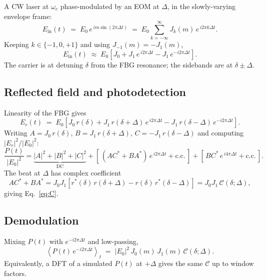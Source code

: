 \documentclass[aps,pra, onecolumn,superscriptaddress,nopacs,floatfix, showkeys, notitlepage]{revtex4-1}
\begin{document}
A CW laser at $\omega_c$ phase-modulated by an EOM at $\Delta$, in the
slowly-varying envelope frame:
\begin{equation}
    E_{\mathrm{in}}(t) \;=\; E_0\, e^{\,i m \sin(2\pi\Delta t)}
    \;=\; E_0 \sum_{k=-\infty}^{\infty} J_k(m)\, e^{\,i 2\pi k\Delta t}.
\end{equation}
Keeping $k \in \{-1,0,+1\}$ and using $J_{-1}(m) = -J_1(m)$,
\begin{equation}
    E_{\mathrm{in}}(t) \;\approx\; E_0\!\left[J_0 + J_1\,e^{\,i 2\pi\Delta t} - J_1\,e^{-i 2\pi\Delta t}\right].
\end{equation}
The carrier is at detuning $\delta$ from the FBG resonance; the sidebands
are at $\delta\pm\Delta$.

\subsection{Reflected field and photodetection}

Linearity of the FBG gives
\begin{equation}
    E_r(t) \;=\; E_0\!\left[J_0\,r(\delta)
      + J_1\,r(\delta+\Delta)\,e^{\,i 2\pi\Delta t}
      - J_1\,r(\delta-\Delta)\,e^{-i 2\pi\Delta t}\right].
\end{equation}
Writing $A = J_0\,r(\delta)$, $B = J_1\,r(\delta+\Delta)$,
$C = -J_1\,r(\delta-\Delta)$ and computing $|E_r|^2/|E_0|^2$:
\begin{equation}
    \frac{P(t)}{|E_0|^2}
    = \underbrace{|A|^2+|B|^2+|C|^2}_{\text{DC}}
    + \left[\,(A C^* + B A^*)\,e^{\,i 2\pi\Delta t} + \text{c.c.}\,\right]
    + \left[\,B C^*\,e^{\,i 4\pi\Delta t} + \text{c.c.}\,\right].
\end{equation}
The beat at $\Delta$ has complex coefficient
\begin{equation}
    A C^* + B A^*
    = J_0 J_1\!\left[r^*(\delta)\,r(\delta+\Delta) - r(\delta)\,r^*(\delta-\Delta)\right]
    = J_0 J_1\,\mathcal{C}(\delta;\Delta),
\end{equation}
giving Eq.~\eqref{eq:C}.

\subsection{Demodulation}

Mixing $P(t)$ with $e^{-i 2\pi\Delta t}$ and low-passing,
\begin{equation}
    \left\langle P(t)\,e^{-i 2\pi\Delta t}\right\rangle_t
    \;=\; |E_0|^2\, J_0(m)\, J_1(m)\,\mathcal{C}(\delta;\Delta).
\end{equation}
Equivalently, a DFT of a simulated $P(t)$ at $+\Delta$ gives the same
$\mathcal{C}$ up to window factors.
\end{document}
